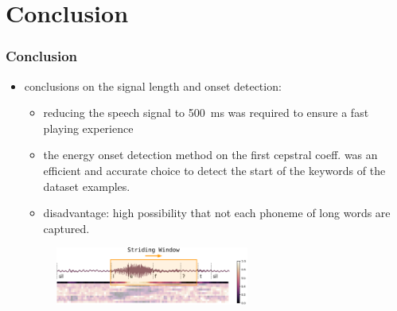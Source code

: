 
\section{Conclusion}
\begin{frame}
  \frametitle{Conclusion}
  \begin{itemize}
    \item conclusions on the signal length and onset detection:
    \begin{itemize}
      \item reducing the speech signal to \SI{500}{\milli\second} was required to ensure a fast playing experience
      \item the energy onset detection method on the first cepstral coeff. was an efficient and accurate choice to detect the start of the keywords of the dataset examples.
      \item disadvantage: high possibility that not each phoneme of long words are captured.
    \end{itemize}
    \begin{figure} \includegraphics[width=0.6\textwidth]{../3_signal/figs/signal_onset_window.pdf} \end{figure}
  \end{itemize}
\end{frame}

